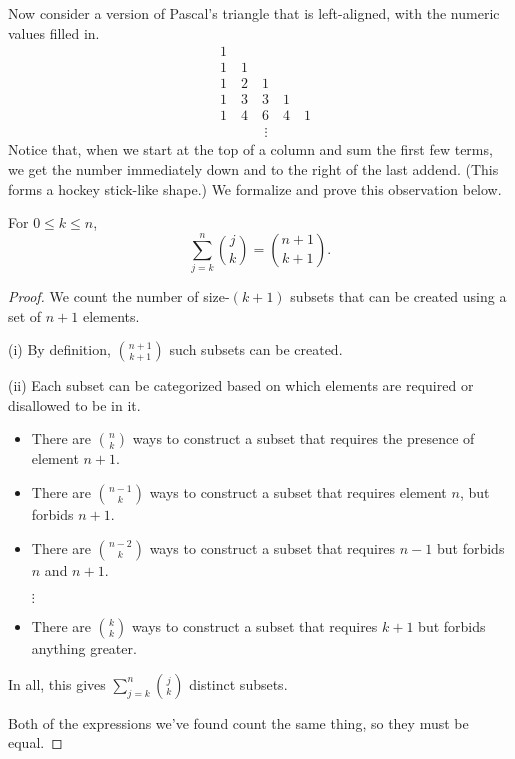 \documentclass[../m055main.tex]{subfiles}
\begin{document}
Now consider a version of Pascal's triangle that is left-aligned, with the numeric values filled in.
\begin{align*}
    & 1 \quad \\
    & 1 \quad 1 \\
    & 1 \quad 2 \quad 1 \\
    & 1 \quad 3 \quad 3 \quad 1 \\
    & 1 \quad 4 \quad 6 \quad 4 \quad 1 \\
    & \phantom{1 \quad 4 \quad\,} \vdots
\end{align*}
Notice that, when we start at the top of a column and sum the first few terms, we get the number immediately down and to the right of the last addend.
(This forms a hockey stick-like shape.)
We formalize and prove this observation below.

\begin{theorem}
    For $0 \leq k \leq n$,
    \[ \sum_{j=k}^{n} {j \choose k} = {n+1 \choose k+1}. \]
\end{theorem}

\begin{proof}
    We count the number of size-$(k+1)$ subsets that can be created using a set of $n+1$ elements.
    \smallskip

    (i) By definition, ${n+1 \choose k+1}$ such subsets can be created.
    \smallskip

    (ii) Each subset can be categorized based on which elements are required or disallowed to be in it.
    \begin{itemize}
        \item There are ${n \choose k}$ ways to construct a subset that requires the presence of element $n+1$.
        \item There are ${n-1 \choose k}$ ways to construct a subset that requires element $n$, but forbids $n+1$.
        \item There are ${n-2 \choose k}$ ways to construct a subset that requires $n-1$ but forbids $n$ and $n+1$.
        \item[$\vdots$]
        \item There are ${k \choose k}$ ways to construct a subset that requires $k+1$ but forbids anything greater.
    \end{itemize}
    In all, this gives $\sum\limits_{j=k}^{n} {j \choose k}$ distinct subsets.

    Both of the expressions we've found count the same thing, so they must be equal.
\end{proof}
\end{document}
